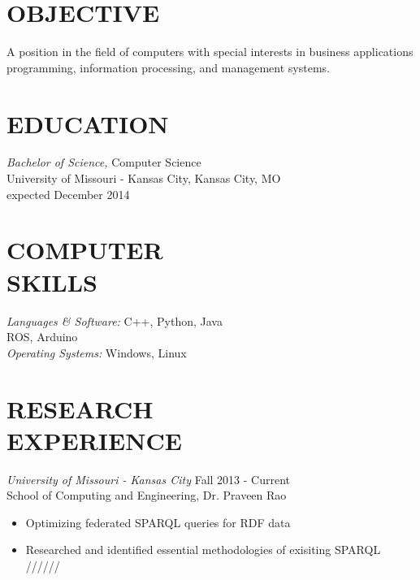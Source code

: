 \documentclass[line,margin]{res}
\begin{document}
\address{\hfill 11408 Colorado Ave \#12, Kansas City, MO 64137}
\address{\hfill (913)235-1070 \textbar \textbar \hspace{1 mm}  victoria.chen.wu@gmail.com}

 
\begin{resume}
 
\section{OBJECTIVE}       A position in the field of computers with special 
                interests in business applications programming, 
                information processing, and management systems. 
 
 
\section{EDUCATION} {\sl Bachelor of Science,} Computer Science\\
                University of Missouri - Kansas City, Kansas City, MO \\
                expected December 2014 

\section{COMPUTER \\ SKILLS} {\sl Languages \& Software:} 
		C++, Python, Java \\
		ROS, Arduino \\
                {\sl Operating Systems:} Windows, Linux 
\section {RESEARCH \\ EXPERIENCE}
		{\sl University of Missouri - Kansas City} \hfill Fall 2013 - Current \\
		School of Computing and Engineering, Dr. Praveen Rao
		 \begin{itemize} [leftmargin=5mm]  \itemsep -2pt %
		 \item  Optimizing federated SPARQL queries for RDF data
		\item   Researched and identified essential methodologies of exisiting SPARQL ////// 
		\end{itemize}



\end{resume}
\end{document}
